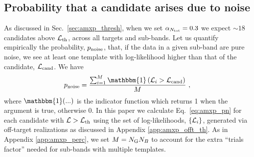 \begin{subappendices}
\subsection{Probability that a candidate arises due to noise \label{app:amxp_pnoise}}
As discussed in Sec.~\ref{sec:amxp_thresh}, when we set $\alpha_{N_{\rm tot}} = 0.3$ we expect $\sim18$ candidates above $\mathcal{L}_{\rm th}$, across all targets and sub-bands. Let us quantify empirically the probability, $p_{\rm noise}$, that, if the data in a given sub-band are pure noise, we see at least one template with log-likelihood higher than that of the candidate, $\mathcal{L}_{\rm cand}$. We have
\begin{equation}
\pn = \frac{\sum_{i=1}^M \mathbbm{1}\left(\ml_i > \ml_{\rm cand} \right)}{M}\ , \label{eq:amxp_pn}
\end{equation}
where $\mathbbm{1}(...)$ is the indicator function which returns 1 when the argument is true, otherwise 0. In this paper we calculate Eq.~\eqref{eq:amxp_pn} for each candidate with $\mathcal{L} > \mathcal{L}_{\rm th}$ using the set of log-likelihoods, $\{\mathcal{L}_i\}$, generated via off-target realizations as discussed in Appendix \ref{app:amxp_offt_th}. As in Appendix \ref{app:amxp_perc}, we set $M = N_{\rm G} N_B$ to account for the extra ``trials factor'' needed for sub-bands with multiple templates.


\end{subappendices}
